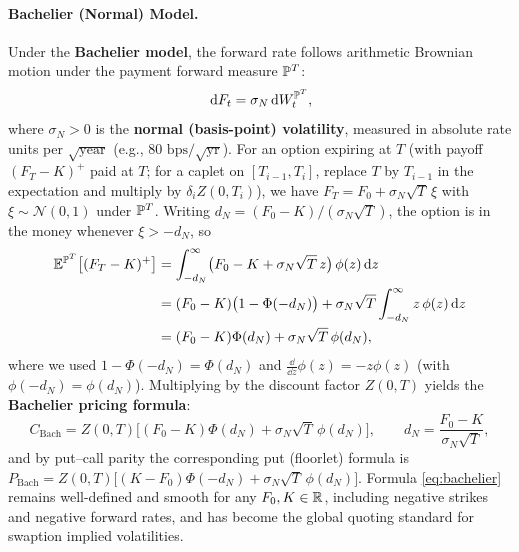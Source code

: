 \paragraph{Bachelier (Normal) Model.}
Under the \textbf{Bachelier model}, the forward rate follows arithmetic Brownian motion under the payment forward measure $\mathbb{P}^T$:
\[
\,\mathrm{d} F_t = \sigma_N\,\mathrm{d} W_t^{\mathbb{P}^T},
\]
where $\sigma_N > 0$ is the \textbf{normal (basis-point) volatility}, measured in absolute rate units per $\sqrt{\text{year}}$ (e.g., $80\text{ bps}/\sqrt{\text{yr}}$). For an option expiring at $T$ (with payoff $(F_T - K)^+$ paid at $T$; for a caplet on $[T_{i-1}, T_i]$, replace $T$ by $T_{i-1}$ in the expectation and multiply by $\delta_i Z(0, T_i)$), we have $F_T = F_0 + \sigma_N\sqrt{T}\,\xi$ with $\xi \sim \mathcal{N}(0, 1)$ under $\mathbb{P}^T$. Writing $d_N = (F_0 - K) / (\sigma_N\sqrt{T})$, the option is in the money whenever $\xi > -d_N$, so
\begin{align*}
\mathbb{E}^{\mathbb{P}^T}\!\left[(F_T - K)^+\right]
&= \int_{-d_N}^{\infty} \bigl(F_0 - K + \sigma_N\sqrt{T}\,z\bigr)\,\phi(z)\,\mathrm{d} z \\
&= (F_0 - K)\bigl(1 - \Phi(-d_N)\bigr) + \sigma_N\sqrt{T}\int_{-d_N}^{\infty} z\,\phi(z)\,\mathrm{d} z \\
&= (F_0 - K)\Phi(d_N) + \sigma_N\sqrt{T}\,\phi(d_N),
\end{align*}
where we used $1 - \Phi(-d_N) = \Phi(d_N)$ and $\frac{\dd}{\dd z}\phi(z) = -z\phi(z)$ (with $\phi(-d_N) = \phi(d_N)$). Multiplying by the discount factor $Z(0, T)$ yields the \textbf{Bachelier pricing formula}:
\begin{equation}\label{eq:bachelier}
C_{\mathrm{Bach}} = Z(0, T)\bigl[(F_0 - K)\Phi(d_N) + \sigma_N\sqrt{T}\,\phi(d_N)\bigr], \qquad d_N = \frac{F_0 - K}{\sigma_N\sqrt{T}},
\end{equation}
and by put--call parity the corresponding put (floorlet) formula is $P_{\mathrm{Bach}} = Z(0, T)\bigl[(K - F_0)\Phi(-d_N) + \sigma_N\sqrt{T}\,\phi(d_N)\bigr]$. Formula \eqref{eq:bachelier} remains well-defined and smooth for any $F_0, K \in \mathbb{R}$, including negative strikes and negative forward rates, and has become the global quoting standard for swaption implied volatilities.

